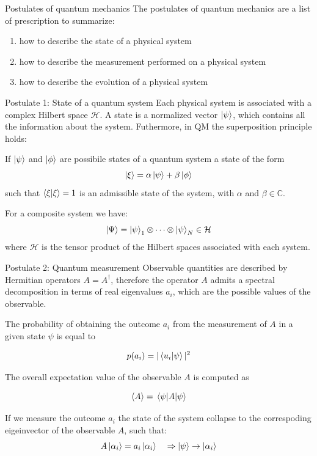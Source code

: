\documentclass[11p,aspectratio=169]{beamer}
\begin{document}
\begin{frame}{Postulates of quantum mechanics}
    The postulates of quantum mechanics are a list of prescription to summarize:
    \pause
    \begin{enumerate}
        \item how to describe the state of a physical system
        \pause
        \item how to describe the measurement performed on a physical system \pause
        \item how to describe the evolution of a physical system
    \end{enumerate}
    
\end{frame}

\begin{frame}{Postulate 1: State of a quantum system}
    Each physical system is associated with a complex Hilbert space $\mathcal{H}$. 
    A state is a normalized vector $\ket{\psi}$, which contains all the information about the system.
    Futhermore, in QM the superposition principle holds:
    \begin{tcolorbox}[title=Superposition principle]
       If $\ket{\psi}$ and $\ket{\phi}$ are possibile states of a quantum system a state of the form
       $$ \ket{\xi} = \alpha \ket{\psi} + \beta \ket{\phi}$$ such that $\bra{\xi} \ket{\xi} = 1$ is 
       an admissible state of the system, with $\alpha$ and $\beta \in \mathbb{C}$.
     \end{tcolorbox}

     For a composite system we have:
     $$ \ket{\Psi} = \ket{\psi}_1 \otimes \cdots \otimes \ket{\psi}_N \in \mathcal{H} $$
     where $\mathcal{H}$ is the tensor product of the Hilbert spaces associated with each system.
    \end{frame}
\begin{frame}{Postulate 2: Quantum measurement}
    Observable quantities are described by Hermitian operators $A = {A}^\dagger$,
    therefore the operator $A$ admits a spectral decomposition in terms of real eigenvalues $a_i$,
    which are the possible values of the observable.

    The probability of obtaining the outcome $a_i$ from the measurement of $A$ in a given state
    $\psi$ is equal to

    $$ p(a_i) = | \bra{u_i} \ket{\psi}|^2 $$

    The overall expectation value of the observable $A$ is computed as

    $$ \expval{A} = \expval{A}{\psi} $$

    \begin{tcolorbox}
        If we measure the outcome $a_i$ the state of the system collapse to the correspoding eigeinvector
        of the observable $A$, such that:
        $$ A \ket{\alpha_i} = a_i \ket{\alpha_i} \quad \Rightarrow \ket{\psi} \rightarrow \ket{\alpha_i}$$
    \end{tcolorbox}

\end{frame}
\end{document}

